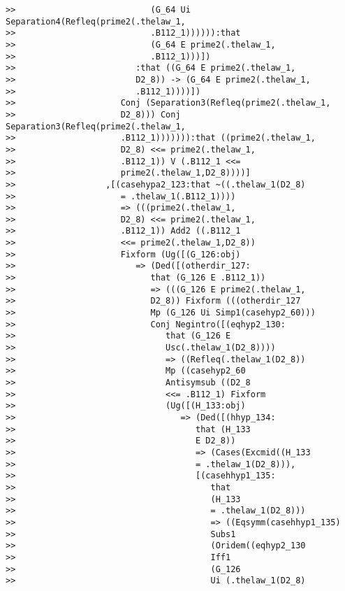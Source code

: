 \documentclass[12pt]{article}
\begin{document}
\begin{verbatim}
>>                           (G_64 Ui Separation4(Refleq(prime2(.thelaw_1,
>>                           .B112_1)))))):that
>>                           (G_64 E prime2(.thelaw_1,
>>                           .B112_1)))])
>>                        :that ((G_64 E prime2(.thelaw_1,
>>                        D2_8)) -> (G_64 E prime2(.thelaw_1,
>>                        .B112_1))))])
>>                     Conj (Separation3(Refleq(prime2(.thelaw_1,
>>                     D2_8))) Conj Separation3(Refleq(prime2(.thelaw_1,
>>                     .B112_1))))))):that ((prime2(.thelaw_1,
>>                     D2_8) <<= prime2(.thelaw_1,
>>                     .B112_1)) V (.B112_1 <<=
>>                     prime2(.thelaw_1,D2_8))))]
>>                  ,[(casehypa2_123:that ~((.thelaw_1(D2_8)
>>                     = .thelaw_1(.B112_1))))
>>                     => (((prime2(.thelaw_1,
>>                     D2_8) <<= prime2(.thelaw_1,
>>                     .B112_1)) Add2 ((.B112_1
>>                     <<= prime2(.thelaw_1,D2_8))
>>                     Fixform (Ug([(G_126:obj)
>>                        => (Ded([(otherdir_127:
>>                           that (G_126 E .B112_1))
>>                           => (((G_126 E prime2(.thelaw_1,
>>                           D2_8)) Fixform (((otherdir_127
>>                           Mp (G_126 Ui Simp1(casehyp2_60)))
>>                           Conj Negintro([(eqhyp2_130:
>>                              that (G_126 E
>>                              Usc(.thelaw_1(D2_8))))
>>                              => ((Refleq(.thelaw_1(D2_8))
>>                              Mp ((casehyp2_60
>>                              Antisymsub ((D2_8
>>                              <<= .B112_1) Fixform
>>                              (Ug([(H_133:obj)
>>                                 => (Ded([(hhyp_134:
>>                                    that (H_133
>>                                    E D2_8))
>>                                    => (Cases(Excmid((H_133
>>                                    = .thelaw_1(D2_8))),
>>                                    [(casehhyp1_135:
>>                                       that
>>                                       (H_133
>>                                       = .thelaw_1(D2_8)))
>>                                       => ((Eqsymm(casehhyp1_135)
>>                                       Subs1
>>                                       (Oridem((eqhyp2_130
>>                                       Iff1
>>                                       (G_126
>>                                       Ui (.thelaw_1(D2_8)

\end{verbatim}
\end{document}

